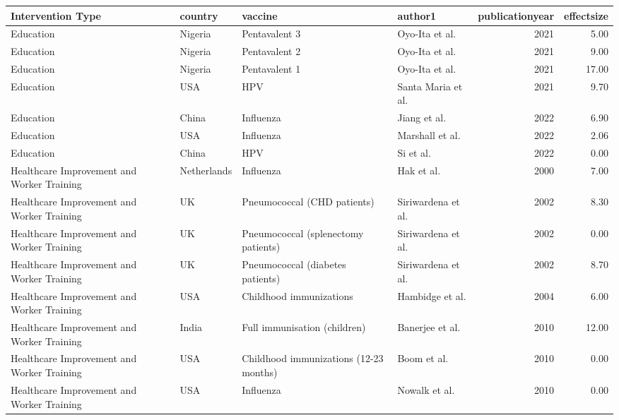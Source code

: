 
\begin{tabular}{llllrr}
\toprule
Intervention Type & country & vaccine & author1 & publicationyear & effectsize\\
\midrule
Education & Nigeria & Pentavalent 3 & Oyo-Ita et al. & 2021 & 5.00\\
Education & Nigeria & Pentavalent 2 & Oyo-Ita et al. & 2021 & 9.00\\
Education & Nigeria & Pentavalent 1 & Oyo-Ita et al. & 2021 & 17.00\\
Education & USA & HPV & Santa Maria et al. & 2021 & 9.70\\
Education & China & Influenza & Jiang et al. & 2022 & 6.90\\
\addlinespace
Education & USA & Influenza & Marshall et al. & 2022 & 2.06\\
Education & China & HPV & Si et al. & 2022 & 0.00\\
Healthcare Improvement and Worker Training & Netherlands & Influenza & Hak et al. & 2000 & 7.00\\
Healthcare Improvement and Worker Training & UK & Pneumococcal (CHD patients) & Siriwardena et al. & 2002 & 8.30\\
Healthcare Improvement and Worker Training & UK & Pneumococcal (splenectomy patients) & Siriwardena et al. & 2002 & 0.00\\
\addlinespace
Healthcare Improvement and Worker Training & UK & Pneumococcal (diabetes patients) & Siriwardena et al. & 2002 & 8.70\\
Healthcare Improvement and Worker Training & USA & Childhood immunizations & Hambidge et al. & 2004 & 6.00\\
Healthcare Improvement and Worker Training & India & Full immunisation (children) & Banerjee et al. & 2010 & 12.00\\
Healthcare Improvement and Worker Training & USA & Childhood immunizations (12-23 months) & Boom et al. & 2010 & 0.00\\
Healthcare Improvement and Worker Training & USA & Influenza & Nowalk et al. & 2010 & 0.00\\
\bottomrule
\end{tabular}
